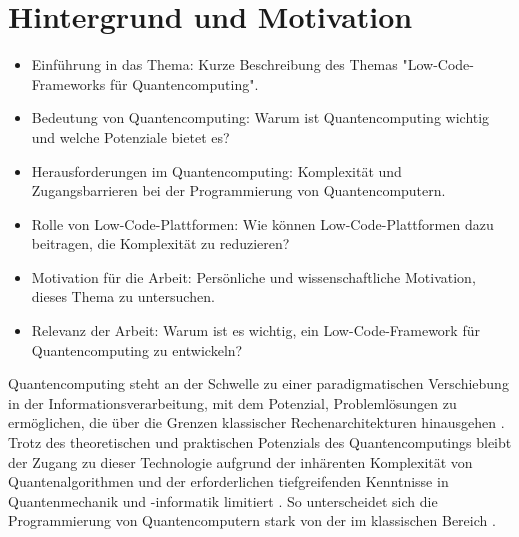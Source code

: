 \section{Hintergrund und Motivation}
\begin{itemize}
  \item Einführung in das Thema: Kurze Beschreibung des Themas "Low-Code-Frameworks für Quantencomputing".
  \item Bedeutung von Quantencomputing: Warum ist Quantencomputing wichtig und welche Potenziale bietet es?
  \item Herausforderungen im Quantencomputing: Komplexität und Zugangsbarrieren bei der Programmierung von Quantencomputern.
  \item Rolle von Low-Code-Plattformen: Wie können Low-Code-Plattformen dazu beitragen, die Komplexität zu reduzieren?
  \item Motivation für die Arbeit: Persönliche und wissenschaftliche Motivation, dieses Thema zu untersuchen.
  \item Relevanz der Arbeit: Warum ist es wichtig, ein Low-Code-Framework für Quantencomputing zu entwickeln?
\end{itemize}

Quantencomputing steht an der Schwelle zu einer paradigmatischen
Verschiebung in der Informationsverarbeitung, mit dem Potenzial,
Problemlösungen zu ermöglichen, die über die Grenzen klassischer
Rechenarchitekturen hinausgehen \cite{Shor1999}. Trotz des theoretischen und
praktischen Potenzials des Quantencomputings bleibt der Zugang zu dieser
Technologie aufgrund der inhärenten Komplexität von Quantenalgorithmen
und der erforderlichen tiefgreifenden Kenntnisse in Quantenmechanik und
-informatik limitiert \cite{Chitransh2022}. So unterscheidet sich die Programmierung
von Quantencomputern stark von der im klassischen Bereich \cite{Rieffel2011}.

